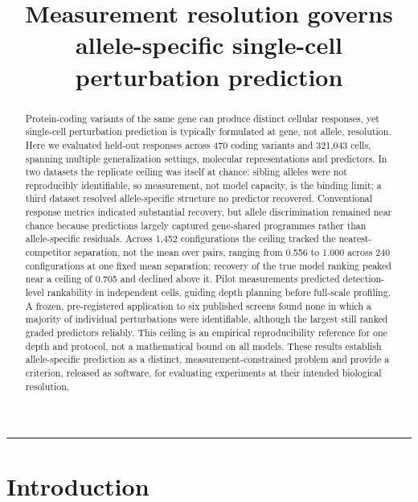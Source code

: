 \documentclass[11pt,letterpaper]{article}
\title{Measurement resolution governs allele-specific single-cell perturbation prediction}
\author{}
\date{}
\begin{document}
\maketitle

\bigskip

\begin{abstract}
\noindent

Protein-coding variants of the same gene can produce distinct cellular responses, yet single-cell perturbation prediction is typically formulated at gene, not allele, resolution. Here we evaluated held-out responses across 470 coding variants and 321,043 cells, spanning multiple generalization settings, molecular representations and predictors. In two datasets the replicate ceiling was itself at chance: sibling alleles were not reproducibly identifiable, so measurement, not model capacity, is the binding limit; a third dataset resolved allele-specific structure no predictor recovered. Conventional response metrics indicated substantial recovery, but allele discrimination remained near chance because predictions largely captured gene-shared programmes rather than allele-specific residuals. Across 1,452 configurations the ceiling tracked the nearest-competitor separation, not the mean over pairs, ranging from 0.556 to 1.000 across 240 configurations at one fixed mean separation; recovery of the true model ranking peaked near a ceiling of 0.705 and declined above it. Pilot measurements predicted detection-level rankability in independent cells, guiding depth planning before full-scale profiling. A frozen, pre-registered application to six published screens found none in which a majority of individual perturbations were identifiable, although the largest still ranked graded predictors reliably. This ceiling is an empirical reproducibility reference for one depth and protocol, not a mathematical bound on all models. These results establish allele-specific prediction as a distinct, measurement-constrained problem and provide a criterion, released as software, for evaluating experiments at their intended biological resolution.


\end{abstract}

\bigskip\noindent\rule{\textwidth}{0.4pt}\bigskip


\section*{Introduction}
\end{document}
